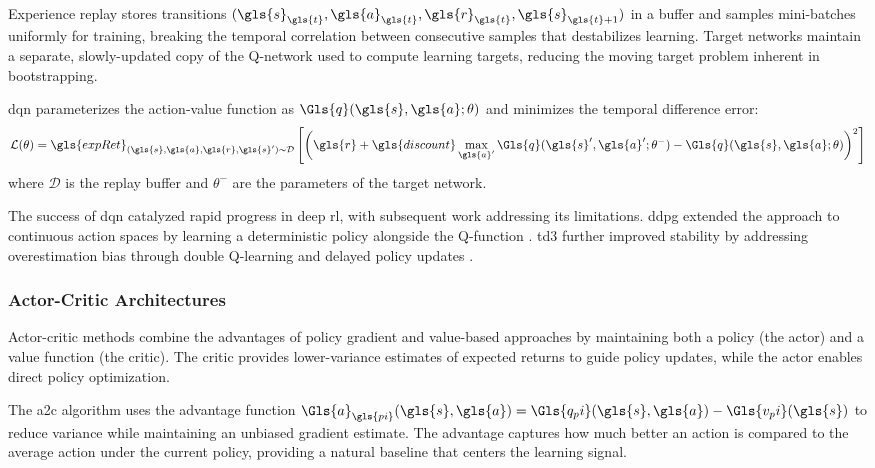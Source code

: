 Experience replay stores transitions 
\((\gls{s}_{\gls{t}}, \gls{a}_{\gls{t}}, \gls{r}_{\gls{t}}, \gls{s}_{\gls{t}+1})\)
in a buffer and samples mini-batches uniformly for training, breaking the 
temporal correlation between consecutive samples that destabilizes learning. 
Target networks maintain a separate, slowly-updated copy of the Q-network 
used to compute learning targets, reducing the moving target problem inherent 
in bootstrapping.

\Gls{dqn} parameterizes the action-value function as \(\Gls{q}(\gls{s}, \gls{a}; \theta)\)
and minimizes the temporal difference error:
\begin{equation}
    \mathcal{L}(\theta) = \gls{expRet}_{(\gls{s},\gls{a},\gls{r},\gls{s}') \sim \mathcal{D}} 
    \left[ \left( \gls{r} + \gls{discount} \max_{\gls{a}'} \Gls{q}(\gls{s}', \gls{a}'; 
        \theta^-) - \Gls{q}(\gls{s}, \gls{a}; \theta) \right)^2 \right]
\end{equation}
where \(\mathcal{D}\) is the replay buffer and 
\(\theta^-\) are the parameters of the target network.

The success of \gls{dqn} catalyzed rapid progress in deep \gls{rl}, 
with subsequent work addressing its limitations. 
\Gls{ddpg} extended the approach to continuous action spaces by learning 
a deterministic policy alongside the Q-function \cite{lillicrap2019}.
\Gls{td3} further improved stability by addressing overestimation bias 
through double Q-learning and delayed policy updates \cite{fujimoto2018}.

\subsubsection{Actor-Critic Architectures}

Actor-critic methods combine the advantages of policy gradient and 
value-based approaches by maintaining both a policy (the actor) 
and a value function (the critic). The critic provides lower-variance 
estimates of expected returns to guide policy updates, 
while the actor enables direct policy optimization.

The \gls{a2c} algorithm uses the advantage function 
\(\Gls{a}_{\gls{pi}}(\gls{s}, \gls{a}) 
= \Gls{q_pi}(\gls{s}, \gls{a}) 
- \Gls{v_pi}(\gls{s})\)
to reduce variance while maintaining an unbiased gradient estimate. 
The advantage captures how much better an action is compared to the 
average action under the current policy, providing a 
natural baseline that centers the learning signal.

